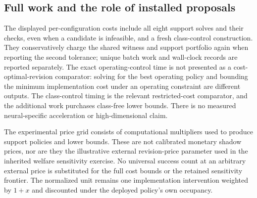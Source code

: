 \subsection{Full work and the role of installed proposals}

The displayed per-configuration costs include all eight support solves and their checks, even when a candidate is infeasible, and a fresh class-control construction. They conservatively charge the shared witness and support portfolio again when reporting the second tolerance; unique batch work and wall-clock records are reported separately. The exact operating-control time is not presented as a cost-optimal-revision comparator: solving for the best operating policy and bounding the minimum implementation cost under an operating constraint are different outputs. The class-control timing is the relevant restricted-cost comparator, and the additional work purchases class-free lower bounds. There is no measured neural-specific acceleration or high-dimensional claim.

The experimental price grid consists of computational multipliers used to produce support policies and lower bounds. These are not calibrated monetary shadow prices, nor are they the illustrative external revision-price parameter used in the inherited welfare sensitivity exercise. No universal success count at an arbitrary external price is substituted for the full cost bounds or the retained sensitivity frontier. The normalized unit remains one implementation intervention weighted by $1+x$ and discounted under the deployed policy's own occupancy.
